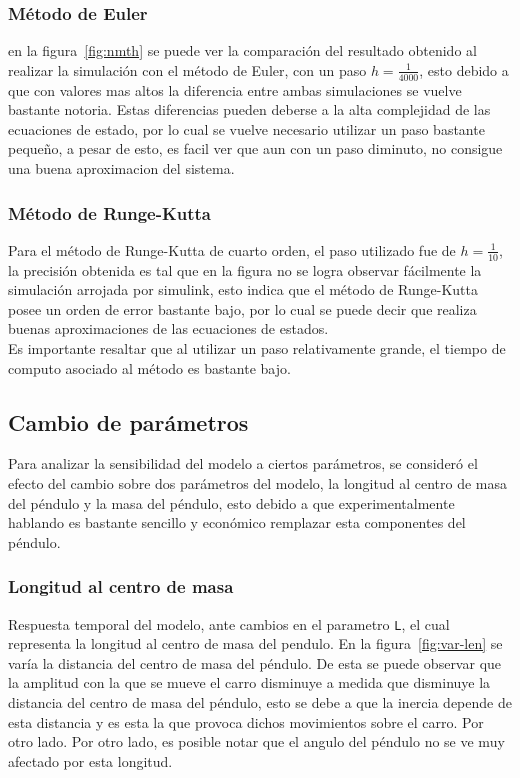 \documentclass{ieeeaccess}
\begin{document}
\subsubsection{Método de Euler}
en la figura~\ref{fig:nmth} se puede ver la comparación del resultado
obtenido al realizar la simulación con el método de Euler, con un
paso $h = \frac{1}{4000}$, esto debido a que con valores mas altos
la diferencia entre ambas simulaciones se vuelve bastante notoria.
Estas diferencias pueden deberse a la alta complejidad de las
ecuaciones de estado, por lo cual se vuelve necesario utilizar un
paso bastante pequeño, a pesar de esto, es facil ver que aun con
un paso diminuto, no consigue una buena aproximacion del sistema.
\subsubsection{Método de Runge-Kutta}
Para el método de Runge-Kutta de cuarto orden, el paso utilizado fue
de $h = \frac{1}{10}$, la precisión obtenida es tal que en la figura
no se logra observar fácilmente la simulación arrojada por simulink,
esto indica que el método de Runge-Kutta posee un orden de error
bastante bajo, por lo cual se puede decir que realiza buenas
aproximaciones de las ecuaciones de estados.\\
Es importante resaltar que al utilizar un paso relativamente grande,
el tiempo de computo asociado al método es bastante bajo.

\subsection{Cambio de parámetros}
Para analizar la sensibilidad del modelo a ciertos parámetros, se
consideró el efecto del cambio sobre dos parámetros del modelo,
la longitud al centro de masa del péndulo y la masa del péndulo,
esto debido a que experimentalmente hablando es bastante sencillo y
económico remplazar esta componentes del péndulo.
\subsubsection{Longitud al centro de masa}
       {Respuesta temporal del modelo, ante cambios en el parametro
         \texttt{L}, el cual representa la longitud al centro de masa
         del pendulo.\label{fig:var-len}}
En la figura~\ref{fig:var-len} se varía la distancia del centro de masa
del péndulo. De esta se puede observar que la amplitud con la que se
mueve el carro disminuye a medida que disminuye la distancia del centro
de masa del péndulo, esto se debe a que la inercia depende de esta
distancia y es esta la que provoca dichos movimientos sobre el carro.
Por otro lado. Por otro lado, es posible notar que el angulo del péndulo
no se ve muy afectado por esta longitud.
\end{document}
